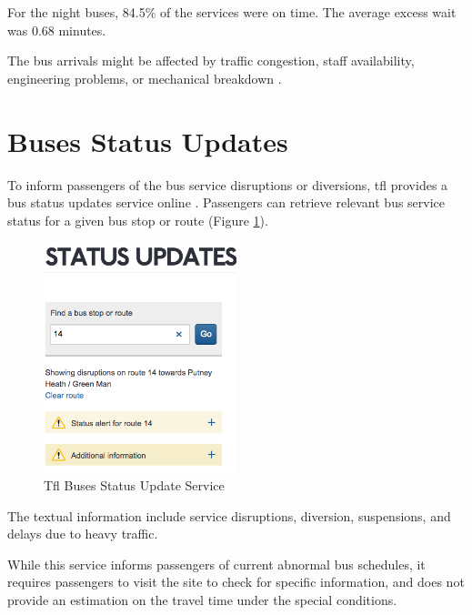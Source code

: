 \par For the night buses, 84.5\% of the services were on time. The average excess wait was 0.68 minutes.


\par The bus arrivals might be affected by traffic congestion, staff availability, engineering problems, or mechanical breakdown \cite{buses_performance_data}.

\section{Buses Status Updates}
\par To inform passengers of the bus service disruptions or diversions, \acrshort{tfl} provides a bus status updates service online \cite{tfl_buses_status_updates}. Passengers can retrieve relevant bus service status for a given bus stop or route (Figure \ref{fig:tfl_status_update}).

\begin{figure}
\centering
\includegraphics[width=0.5\textwidth]{figures/tfl_status_update.png}
\caption{\label{fig:tfl_status_update} Tfl Buses Status Update Service}
\end{figure}

\par The textual information include service disruptions, diversion, suspensions, and delays due to heavy traffic.

\par While this service informs passengers of current abnormal bus schedules, it requires passengers to visit the site to check for specific information, and does not provide an estimation on the travel time under the special conditions.


